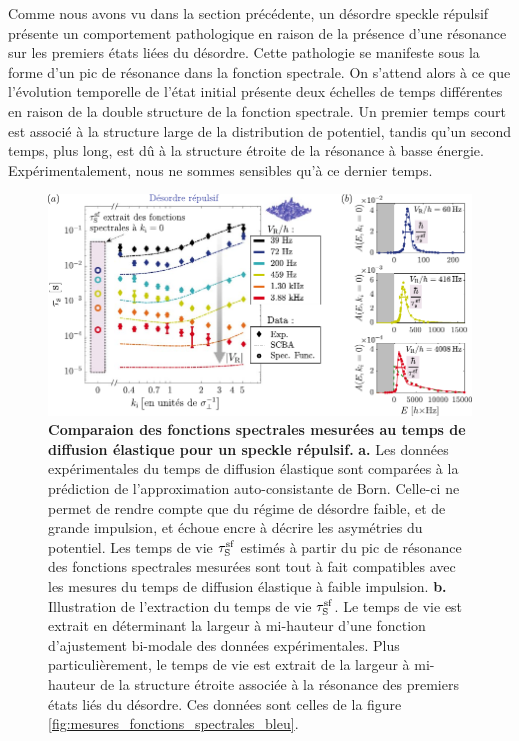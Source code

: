 Comme nous avons vu dans la section précédente, un désordre speckle répulsif présente un comportement pathologique en raison de la présence d'une résonance sur les premiers états liées du désordre. Cette pathologie se manifeste sous la forme d'un pic de résonance dans la fonction spectrale. On s'attend alors à ce que l'évolution temporelle de l'état initial présente deux échelles de temps différentes en raison de la double structure de la fonction spectrale. Un premier temps court est associé à la structure large de la distribution de potentiel, tandis qu'un second temps, plus long, est dû à la structure étroite de la résonance à basse énergie. Expérimentalement, nous ne sommes sensibles qu'à ce dernier temps.

\begin{figure}
\centering
\includegraphics[width=\textwidth]{Fig/TauS_NJP/comparaison_specfunc_taus_bleu.pdf}
\caption{\textbf{Comparaion des fonctions spectrales mesurées au temps de diffusion élastique pour un speckle répulsif.} \textbf{a.} Les données expérimentales du temps de diffusion élastique sont comparées à la prédiction de l'approximation auto-consistante de Born. Celle-ci ne permet de rendre compte que du régime de désordre faible, et de grande impulsion, et échoue encre à décrire les asymétries du potentiel. Les temps de vie $\tau_{\mathrm{S}}^{\mathrm{sf}}$ estimés à partir du pic de résonance des fonctions spectrales mesurées sont tout à fait compatibles avec les mesures du temps de diffusion élastique à faible impulsion. \textbf{b.} Illustration de l'extraction du temps de vie $\tau_{\mathrm{S}}^{\mathrm{sf}}$. Le temps de vie est extrait en déterminant la largeur à mi-hauteur d'une fonction d'ajustement bi-modale des données expérimentales. Plus particulièrement, le temps de vie est extrait de la largeur à mi-hauteur de la structure étroite associée à la résonance des premiers états liés du désordre. Ces données sont celles de la figure \ref{fig:mesures_fonctions_spectrales_bleu}.}
\label{fig:comparaison_taus_specfunc_bleu}
\end{figure}

